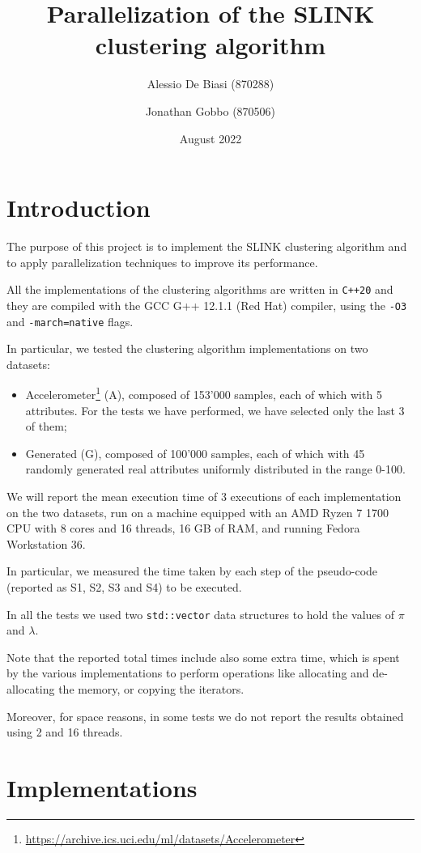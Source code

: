 \documentclass{article}
\title{Parallelization of the SLINK clustering algorithm\vspace{-1.25ex}}
\author{Alessio De Biasi (870288) \and Jonathan Gobbo (870506)}
\date{August 2022}
\begin{document}
\twocolumn
\maketitle

\section{Introduction}

The purpose of this project is to implement the SLINK clustering algorithm and to apply
parallelization techniques to improve its performance.

All the implementations of the clustering algorithms are written in \texttt{C++20} and they are
compiled with the GCC G++ 12.1.1 (Red Hat) compiler, using the \texttt{-O3} and
\texttt{-march=native} flags.

In particular, we tested the clustering algorithm implementations on two datasets:
\begin{itemize}
\item Accelerometer\footnote{\url{https://archive.ics.uci.edu/ml/datasets/Accelerometer}} (A), composed
of 153'000 samples, each of which with 5 attributes. For the tests we have performed, we have
selected only the last 3 of them;
\item Generated (G), composed of 100'000 samples, each of which with 45 randomly generated real
attributes uniformly distributed in the range 0-100.
\end{itemize}

We will report the mean execution time of 3 executions of each implementation on the two datasets,
run on a machine equipped with an AMD Ryzen 7 1700 CPU with 8 cores and 16 threads, 16 GB of RAM,
and running Fedora Workstation 36.

In particular, we measured the time taken by each step of the pseudo-code (reported as S1, S2, S3
and S4) to be executed.

In all the tests we used two \texttt{std::vector} data structures to hold the values of $\pi$ and $\lambda$.

Note that the reported total times include also some extra time, which is spent by the various
implementations to perform operations like allocating and de-allocating the memory, or copying
the iterators.

Moreover, for space reasons, in some tests we do not report the results obtained using 2 and 16
threads.

\hypertarget{implementations}{
\section{Implementations}
\label{implementations}}
\end{document}
